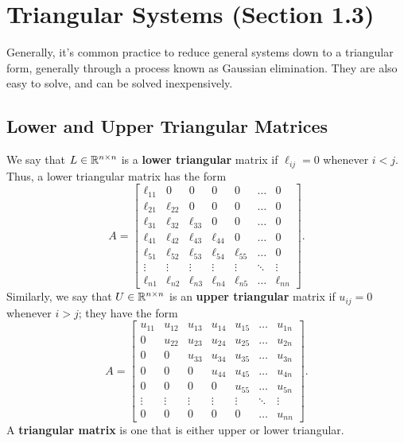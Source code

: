 \documentclass[letterpaper]{article}
\newcommand{\0}{\mathbf{0}}
\begin{document}
\section{Triangular Systems (Section 1.3)}
Generally, it's common practice to reduce general systems down to a triangular form, generally through a process known as Gaussian elimination. They are also easy to solve, and can be solved inexpensively. 

\subsection{Lower and Upper Triangular Matrices}
We say that $L \in \mathbb{R}^{n \times n}$ is a \textbf{lower triangular} matrix if $\ell_{ij} = 0$ whenever $i < j$. Thus, a lower triangular matrix has the form 
\[A = \begin{bmatrix}
    \ell_{11} & 0 & 0 & 0 & 0 & \hdots & 0 \\ 
    \ell_{21} & \ell_{22} & 0 & 0 & 0 & \hdots & 0 \\ 
    \ell_{31} & \ell_{32} & \ell_{33} & 0 & 0 & \hdots & 0 \\ 
    \ell_{41} & \ell_{42} & \ell_{43} & \ell_{44} & 0 & \hdots & 0 \\ 
    \ell_{51} & \ell_{52} & \ell_{53} & \ell_{54} & \ell_{55} & \hdots & 0 \\
    \vdots & \vdots & \vdots & \vdots & \vdots & \ddots & \vdots \\  
    \ell_{n1} & \ell_{n2} & \ell_{n3} & \ell_{n4} & \ell_{n5} & \hdots & \ell_{nn}
\end{bmatrix}.\]
Similarly, we say that $U \in \mathbb{R}^{n \times n}$ is an \textbf{upper triangular} matrix if $u_{ij} = 0$ whenever $i > j$; they have the form 
\[A = \begin{bmatrix}
    u_{11} & u_{12} & u_{13} & u_{14} & u_{15} & \hdots & u_{1n} \\ 
    0 & u_{22} & u_{23} & u_{24} & u_{25} & \hdots & u_{2n} \\ 
    0 & 0 & u_{33} & u_{34} & u_{35} & \hdots & u_{3n} \\ 
    0 & 0 & 0 & u_{44} & u_{45} & \hdots & u_{4n} \\ 
    0 & 0 & 0 & 0 & u_{55} & \hdots & u_{5n} \\
    \vdots & \vdots & \vdots & \vdots & \vdots & \ddots & \vdots \\  
    0 & 0 & 0 & 0 & 0 & \hdots & u_{nn}
\end{bmatrix}.\]
A \textbf{triangular matrix} is one that is either upper or lower triangular.
\end{document}
